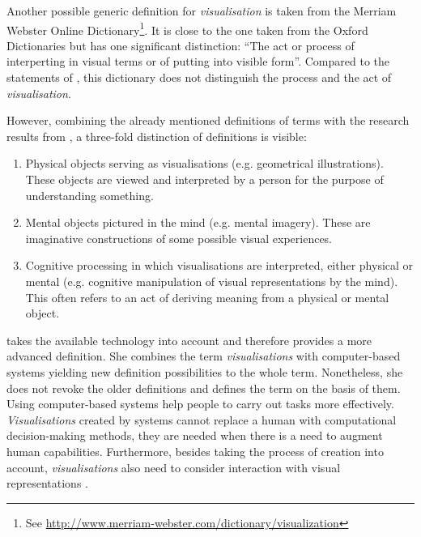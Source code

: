 Another possible generic definition for \textit{visualisation} is taken from the Merriam Webster Online Dictionary\footnote{See \href{http://www.merriam-webster.com/dictionary/visualization}{http://www.merriam-webster.com/dictionary/visualization}}. It is close to the one taken from the Oxford Dictionaries but has one significant distinction: ``The act or process of interperting in visual terms or of putting into visible form''. Compared to the statements of \citeauthor{Phillips2010}, this dictionary does not distinguish the process and the act of \textit{visualisation}.

However, combining the already mentioned definitions of terms with the research results from \citeauthor{Phillips2010}, a three-fold distinction of definitions is visible:
\begin{enumerate}
\item Physical objects serving as visualisations (e.g. geometrical illustrations). These objects are viewed and interpreted by a person for the purpose of understanding something.
\item Mental objects pictured in the mind (e.g. mental imagery). These are imaginative constructions of some possible visual experiences.
\item Cognitive processing in which visualisations are interpreted, either physical or mental (e.g. cognitive manipulation of visual representations by the mind). This often refers to an act of deriving meaning from a physical or mental object.
\end{enumerate}

\cbstart
\citeauthor{Munzner2014} takes the available technology into account and therefore provides a more advanced definition. She combines the term \textit{visualisations} with computer-based systems yielding new definition possibilities to the whole term. Nonetheless, she does not revoke the older definitions and defines the term on the basis of them.
Using computer-based systems help people to carry out tasks more effectively.
\textit{Visualisations} created by systems cannot replace a human with computational decision-making methods, they are needed when there is a need to augment human capabilities. Furthermore, besides taking the process of creation into account, \textit{visualisations} also need to consider interaction with visual representations .


